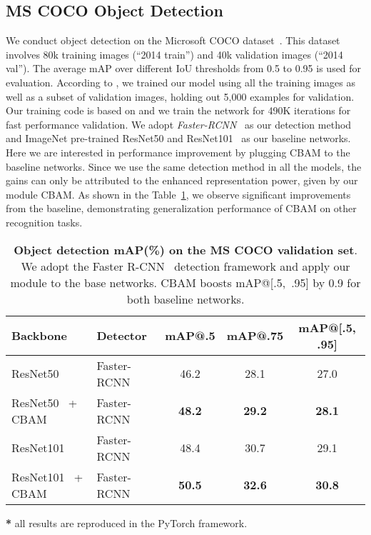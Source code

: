 \documentclass[runningheads]{llncs}
\newcommand{\tabref}[1]{Table~\ref{#1}}
\newcommand*{\modulenameabb}{CBAM}
\begin{document}
\subsection{MS COCO Object Detection}


We conduct object detection on the Microsoft COCO dataset~\cite{lin2014coco}. This dataset involves 80k training images (``2014 train'') and 40k validation images (``2014 val''). The average mAP over different IoU thresholds from 0.5 to 0.95 is used for evaluation. According to \cite{bell2016ion,liu2016ssd}, we trained our model using all the training images as well as a subset of validation images, holding out 5,000 examples for validation. Our training code is based on \cite{chen17implementation} and we train the network for 490K iterations for fast performance validation. We adopt \textit{Faster-RCNN}~\cite{ren2015faster} as our detection method and ImageNet pre-trained ResNet50 and ResNet101~\cite{he2016deep} as our baseline networks. Here we are interested in performance improvement by plugging CBAM to the baseline networks. Since we use the same detection method in all the models, the gains can only be attributed to the enhanced representation power, given by our module CBAM. As shown in the \tabref{table:coco_detect}, we observe significant improvements from the baseline, demonstrating generalization performance of CBAM on other recognition tasks.


\begin{table}[t]
\begin{center}
\setlength{\tabcolsep}{2pt}
\begin{tabular}{ l|l|c|c|c}
\hline
Backbone &Detector            & mAP@.5 & mAP@.75 & mAP@[.5, .95] \\
\hline
\hline
ResNet50~\cite{he2016deep} & Faster-RCNN~\cite{ren2015faster}      & 46.2           & 28.1          & 27.0     \\
ResNet50~\cite{he2016deep} + \modulenameabb  & Faster-RCNN~\cite{ren2015faster}      & \textbf{48.2}  & \textbf{29.2} & \textbf{28.1}     \\
\hline
ResNet101~\cite{he2016deep} &Faster-RCNN~\cite{ren2015faster}      & 48.4           & 30.7          & 29.1     \\
ResNet101~\cite{he2016deep} + \modulenameabb  &Faster-RCNN~\cite{ren2015faster}     & \textbf{50.5}  & \textbf{32.6} & \textbf{30.8}     \\
\hline
\end{tabular}
\end{center}
\begin{tablenotes}
\scriptsize
\item \vspace{-3mm}\hspace*{\fill} \textbf{*} all results are reproduced in the PyTorch framework.
\end{tablenotes}\vspace{2mm}
\caption{\textbf{Object detection mAP(\%) on the MS COCO validation set}. We adopt the Faster R-CNN~\cite{ren2015faster} detection framework and apply our module to the base networks. CBAM boosts mAP@[.5,~.95] by 0.9 for both baseline networks.}
\label{table:coco_detect}
\vspace{-6mm}
\end{table}
\end{document}
